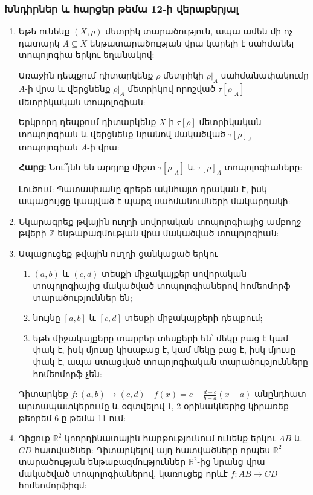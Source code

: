 \bigskip
\bigskip
\subsubsection*{Խնդիրներ և հարցեր թեմա 12-ի վերաբերյալ}

\begin{enumerate}[label=\thesection.\arabic*.]

\item Եթե ունենք $(X, \rho)$ մետրիկ տարածություն, ապա ամեն մի ոչ դատարկ $A \subseteq X$ ենթատարածության վրա կարելի է սահմանել տոպոլոգիա երկու եղանակով:
\par Առաջին դեպքում դիտարկենք $\rho$ մետրիկի $\rho|_A$ սահմանափակումը $A$-ի վրա և վերցնենք $\rho|_A$ մետրիկով որոշված $\tau[\rho|_A]$ մետրիկական տոպոլոգիան:
\par Երկրորդ դեպքում դիտարկենք $X$-ի $\tau[\rho]$ մետրիկական տոպոլոգիան և վերցնենք նրանով մակածված $\tau[\rho]_A$ տոպոլոգիան $A$-ի վրա:
\par \textbf{Հարց:} Նու՞յնն են արդյոք միշտ $\tau[\rho|_A]$ և $\tau[\rho]_A$ տոպոլոգիաները:
\par Լուծում: Պատասխանը գրեթե ակնհայտ դրական է, իսկ ապացույցը կապված է պարզ սահմանումների մակարդակի:

\item Նկարագրեք թվային ուղղի սովորական տոպոլոգիայից ամբողջ թվերի $\mathbb{Z}$ ենթաբազմության վրա մակածված տոպոլոգիան:

\item Ապացուցեք թվային ուղղի ցանկացած երկու
\begin{enumerate}
    \item[ա)] $(a, b)$ և $(c, d)$ տեսքի միջակայքեր սովորական տոպոլոգիայից մակածված տոպոլոգիաներով հոմեոմորֆ տարածություններ են;
    \item[բ)] նույնը $[a, b]$ և $[c, d]$ տեսքի միջակայքերի դեպքում;
    \item[գ)] եթե միջակայքերը տարբեր տեսքերի են՝ մեկը բաց է կամ փակ է, իսկ մյուսը կիսաբաց է, կամ մեկը բաց է, իսկ մյուսը փակ է, ապա ստացված տոպոլոգիական տարածությունները հոմեոմորֆ չեն:
\end{enumerate}

\begin{hint}
Դիտարկեք $f: (a, b) \to (c, d) \quad f(x) = c + \frac{d-c}{b-a}(x-a)$ անընդհատ արտապատկերումը և օգտվելով 1, 2 օրինակներից կիրառեք թեորեմ 6-ը թեմա 11-ում:
\end{hint}

\item Դիցուք $\mathbb{R}^2$ կոորդինատային հարթությունում ունենք երկու $AB$ և $CD$ հատվածներ: Դիտարկելով այդ հատվածները որպես $\mathbb{R}^2$ տարածության ենթաբազմություններ $\mathbb{R}^2$-ից նրանց վրա մակածված տոպոլոգիաներով, կառուցեք որևէ $f: AB \to CD$ հոմեոմորֆիզմ:


\end{enumerate}
